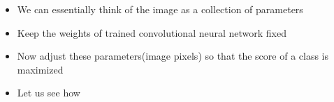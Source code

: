 \begin{frame}
	\begin{columns}
		\begin{overlayarea}{\textwidth}{\textheight}
			
		\end{overlayarea}
		\begin{overlayarea}{\textwidth}{\textheight}
			\begin{itemize}
				\justifying
				\item<1-> We can essentially think of the image as a collection of parameters
				\item<2->Keep the weights of trained convolutional neural network fixed
				\item<3->Now adjust these parameters(image pixels) so that the score of a class is maximized
				\item<4->Let us see how
			\end{itemize}
		\end{overlayarea}
				
		
	\end{columns}
\end{frame}


\begin{frame}
	\begin{overlayarea}{\textwidth}{\textheight}
		
		\begin{enumerate}
			\justifying
		\end{enumerate}
	\end{overlayarea}
	
\end{frame}



